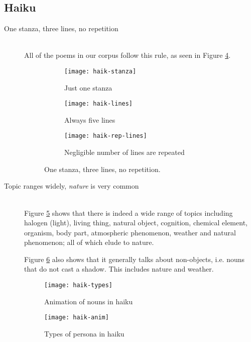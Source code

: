 \subsection{Haiku}

\begin{description}
\item[One stanza, three lines, no repetition]  \hfill \\
All of the poems in our corpus follow this rule, as seen in Figure \ref{fig:haik1}.

\begin{figure}[H]
\centering
\begin{subfigure}[t]{0.3\textwidth}
	\centering
    \texttt{[image: haik-stanza]}
    \caption{Just one stanza}
    \label{fig:haik-stanza}
\end{subfigure}
\begin{subfigure}[t]{0.3\textwidth}
	\centering
    \texttt{[image: haik-lines]}
    \caption{Always five lines}
    \label{fig:haik-lines}
\end{subfigure}
\begin{subfigure}[t]{0.3\textwidth}
	\centering
    \texttt{[image: haik-rep-lines]}
    \caption{Negligible number of lines are repeated}
    \label{fig:haik-rep-lines}
\end{subfigure}
\caption{One stanza, three lines, no repetition.}
\label{fig:haik1}
\end{figure}

\item[Topic ranges widely, \textit{nature} is very common]  \hfill \\
Figure \ref{fig:haik-types} shows that there is indeed a wide range of topics including halogen (light), living thing, natural object, cognition, chemical element, organism, body part, atmospheric phenomenon, weather and natural phenomenon; all of which elude to nature. 

Figure \ref{fig:haik-anim} also shows that it generally talks about non-objects, i.e. nouns that do not cast a shadow. This includes nature and weather.

\begin{figure}[H]
\centering
\texttt{[image: haik-types]}
\caption{Animation of nouns in haiku}
\label{fig:haik-types}
\end{figure}

\begin{figure}[H]
\centering
\texttt{[image: haik-anim]}
\caption{Types of persona in haiku}
\label{fig:haik-anim}
\end{figure}



\end{description}
